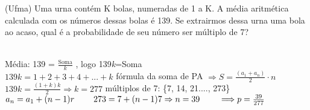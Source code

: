 \begin{ex}
(Ufma) Uma urna contém K bolas, numeradas de 1 a K. A média aritmética calculada com os números dessas bolas é 139.  Se extrairmos dessa urna uma bola ao acaso, qual é a probabilidade de seu número ser múltiplo de 7?
  \begin{sol}
   \phantom{A} \\
   Média: 139 = $\frac{\text{Soma}}{k}$ , logo 139\textit{k}=Soma \\
   $139\textit{k} = 1+2+3+4+...+k$  \hspace{0,5 cm}
   fórmula da soma de PA $\Rightarrow S= \frac{(a_1+a_n)}{2}\cdot n$ \\
   $139k=\frac{(1+k)k}{2} \Longrightarrow k=277$ \hspace{0,5cm} múltiplos de 7: \{7, 14, 21...., 273\}  \\
   $a_n=a_1+(n-1)r \hspace{0,8cm}
   273=7+(n-1)7 \Rightarrow  n=39 \hspace{0,8cm} \Longrightarrow  p=\frac{39}{277}$
  \end{sol}
\end{ex}